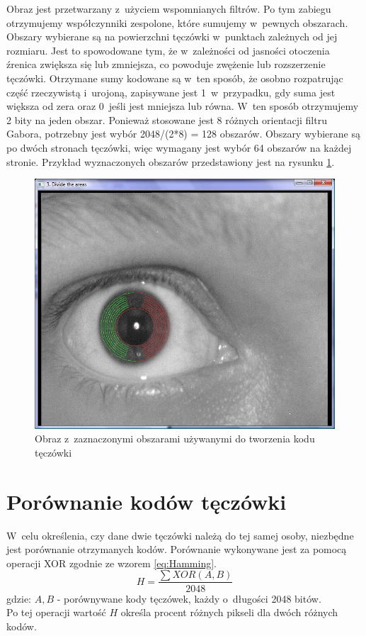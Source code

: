 Obraz jest przetwarzany z~użyciem wspomnianych filtrów. Po tym zabiegu otrzymujemy współczynniki zespolone, które sumujemy w~pewnych obszarach. Obszary wybierane są na powierzchni tęczówki w~punktach zależnych od jej rozmiaru. Jest to spowodowane tym, że w~zależności od jasności otoczenia źrenica zwiększa się lub zmniejsza, co powoduje zwężenie lub rozszerzenie tęczówki. Otrzymane sumy kodowane są w~ten sposób, że osobno rozpatrując część rzeczywistą i~urojoną, zapisywane jest 1~w~przypadku, gdy suma jest większa od zera oraz 0~jeśli jest mniejsza lub równa. W~ten sposób otrzymujemy 2 bity na jeden obszar. Ponieważ stosowane jest 8 różnych orientacji filtru Gabora, potrzebny jest wybór 2048/(2*8) = 128 obszarów. Obszary wybierane są po dwóch stronach tęczówki, więc wymagany jest wybór 64 obszarów na każdej stronie. Przykład wyznaczonych obszarów przedstawiony jest na rysunku \ref{fig:obszaryNasze}.

\begin{figure}
\begin{center}
\includegraphics[scale=0.5]{obszary.jpg}
\caption{Obraz z~zaznaczonymi obszarami używanymi do tworzenia kodu tęczówki}
\label{fig:obszaryNasze}
\end{center}
\end{figure}

\section{Porównanie kodów tęczówki}
\label{sec:porownanieKodow}
W~celu określenia, czy dane dwie tęczówki należą do tej samej osoby, niezbędne jest porównanie otrzymanych kodów. Porównanie wykonywane jest za pomocą operacji XOR zgodnie ze wzorem \ref{eq:Hamming}.
\begin{equation}
\label{eq:Hamming}
H = \frac{\sum XOR(A,B)}{2048}
\end{equation}
gdzie:
$A, B$ - porównywane kody tęczówek, każdy o~długości 2048 bitów.\\
Po tej operacji wartość $H$ określa procent różnych pikseli dla dwóch różnych kodów.

